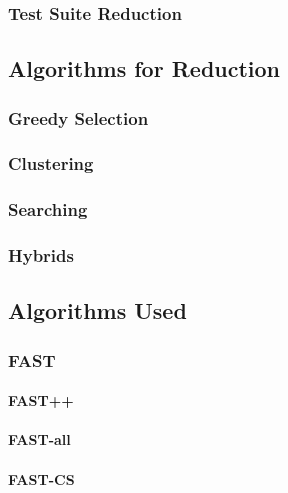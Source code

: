 \documentclass[a4paper,10pt]{article}
\begin{document}
\subsubsection{Test Suite Reduction}

\subsection{Algorithms for Reduction}

\subsubsection{Greedy Selection}


\subsubsection{Clustering}


\subsubsection{Searching}

\subsubsection{Hybrids}

\subsection{Algorithms Used}

\subsubsection{FAST}

\paragraph{FAST++}

\paragraph{FAST-all}

\paragraph{FAST-CS}
\end{document}
